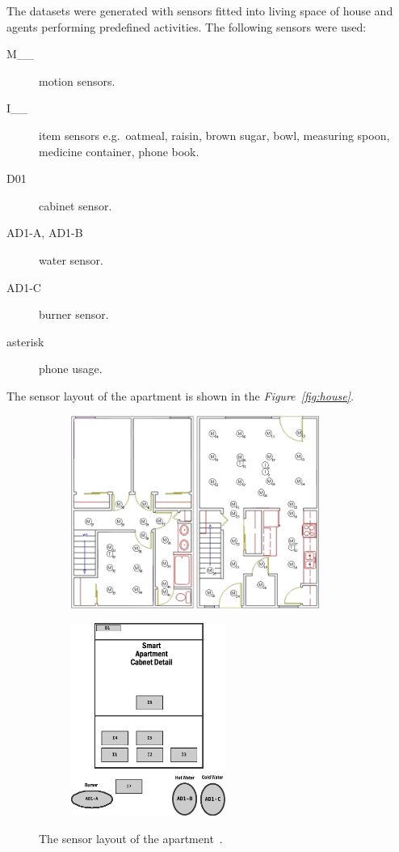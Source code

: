 \documentclass[12pt, a4paper, pdflatex, leqno, twoside, openright]{report}
\begin{document}
The datasets were generated with sensors fitted into living space of house and agents performing predefined activities. The following sensors were used:
\begin{description}
\item[M\_\_] motion sensors.
\item[I\_\_] item sensors e.g.\ oatmeal, raisin, brown sugar, bowl, measuring spoon, medicine container, phone book.
\item[D01] cabinet sensor.
\item[AD1-A, AD1-B] water sensor.
\item[AD1-C] burner sensor.
\item[asterisk] phone usage.
\end{description}

The sensor layout of the apartment is shown in the \emph{Figure~\ref{fig:house}}.

\begin{figure}[htb]
  \centering%
  \begin{subfigure}[b]{0.6\textwidth}
    \includegraphics[height=6.3cm]{gfx/Chinook_3_Bedroom_TH}
    \caption{\label{fig:oner:a}}
  \end{subfigure}%
  \begin{subfigure}[b]{0.3\textwidth}
    \includegraphics[height=6.3cm]{gfx/Chinook_Cabinet}
    \caption{\label{fig:oner:b}}
  \end{subfigure}%
  \caption[The sensor layout of the apartment.]{The sensor layout of the apartment~\citep{cook2009assessing}.\label{fig:oner}}
\end{figure}
\end{document}
